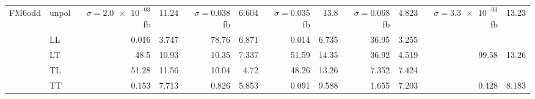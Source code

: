\begin{table}[h]
{\begin{tabular}{llrrrrrrrrrr}
\midrule
\multirow{5}{*}{FM6odd}
 & unpol & $\sigma = \num{2.0e-03}$ fb & \num{11.24} & $\sigma = \num{0.038}$ fb & \num{6.604} & $\sigma = \num{0.035}$ fb & \num{13.8} & $\sigma = \num{0.068}$ fb & \num{4.823} & $\sigma = \num{3.3e-03}$ fb & \num{13.23} \\
 & LL & \num{0.016} & \num{3.747} & \num{78.76} & \num{6.871} & \num{0.014} & \num{6.735} & \num{36.95} & \num{3.255} &  &  \\
 & LT & \num{48.5} & \num{10.93} & \num{10.35} & \num{7.337} & \num{51.59} & \num{14.35} & \num{36.92} & \num{4.519} & \num{99.58} & \num{13.26} \\
 & TL & \num{51.28} & \num{11.56} & \num{10.04} & \num{4.72} & \num{48.26} & \num{13.26} & \num{7.352} & \num{7.424} &  &  \\
 & TT & \num{0.153} & \num{7.713} & \num{0.826} & \num{5.853} & \num{0.091} & \num{9.588} & \num{1.655} & \num{7.203} & \num{0.428} & \num{8.183} \\
\bottomrule
\end{tabular}
}%
\end{table}